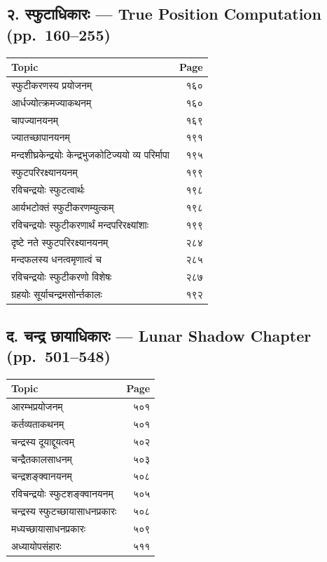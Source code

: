 \documentclass[11pt,a4paper]{article}
\newcommand{\dev}[1]{{\devanagarifont #1}}
\newcommand{\ditem}[1]{{\devanagarifont #1}}
\newcommand{\dhead}[1]{{\devanagarifont\textbf{#1}}}
\begin{document}
\subsection*{\dev{२. स्फुटाधिकारः} --- True Position Computation (pp.\ 160--255)}

\begin{center}
\begin{tabular}{@{}l@{\hspace{2em}}r@{}}
\toprule
\dhead{Topic} & \dhead{Page} \\
\midrule
\ditem{स्फुटीकरणस्य प्रयोजनम्} & १६० \\
\ditem{आर्धज्योत्क्रमज्याकथनम्} & १६० \\
\ditem{चापज्यानयनम्} & १६९ \\
\ditem{ज्यातच्छापानयनम्} & १९१ \\
\ditem{मन्दशीघ्रकेन्द्रयोः केन्द्रभुजकोटिज्ययो व्य परिर्मापा} & १९५ \\
\ditem{स्फुटपरिरक्ष्यानयनम्} & १९९ \\
\ditem{रविचन्द्रयोः स्फुटत्वार्थः} & १९८ \\
\ditem{आर्यभटोक्तं स्फुटीकरणम्युत्कम्} & १९८ \\
\ditem{रविचन्द्रयोः स्फुटीकरणार्थं मन्दपरिरक्ष्यांशाः} & १९९ \\
\ditem{दृष्टे नते स्फुटपरिरक्ष्यानयनम्} & २८४ \\
\ditem{मन्दफलस्य धनत्वमृणात्वं च} & २८५ \\
\ditem{रविचन्द्रयोः स्फुटीकरणो विशेषः} & २८७ \\
\ditem{ग्रहयोः सूर्याचन्द्रमसोर्न्तकालः} & १९२ \\
\bottomrule
\end{tabular}
\end{center}

\subsection*{\dev{द. चन्द्र छायाधिकारः} --- Lunar Shadow Chapter (pp.\ 501--548)}

\begin{center}
\begin{tabular}{@{}l@{\hspace{2em}}r@{}}
\toprule
\dhead{Topic} & \dhead{Page} \\
\midrule
\ditem{आरम्भप्रयोजनम्} & ५०१ \\
\ditem{कर्तव्यताकथनम्} & ५०१ \\
\ditem{चन्द्रस्य दूयाद्दूयत्वम्} & ५०२ \\
\ditem{चन्द्रैतकालसाधनम्} & ५०३ \\
\ditem{चन्द्रशङ्क्वानयनम्} & ५०८ \\
\ditem{रविचन्द्रयोः स्फुटशङ्क्वानयनम्} & ५०५ \\
\ditem{चन्द्रस्य स्फुटच्छायासाधनप्रकारः} & ५०८ \\
\ditem{मध्यच्छायासाधनप्रकारः} & ५०९ \\
\ditem{अध्यायोपसंहारः} & ५११ \\
\bottomrule
\end{tabular}
\end{center}
\end{document}
